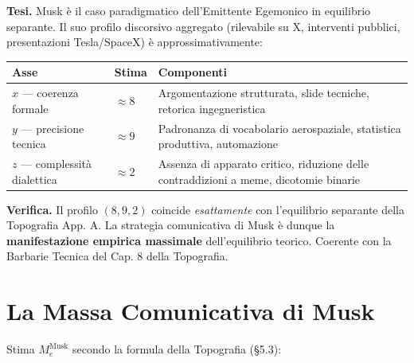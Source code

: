 \Hypoth{} \textbf{Tesi.} Musk è il caso paradigmatico dell'Emittente
Egemonico in equilibrio separante. Il suo profilo discorsivo aggregato
(rilevabile su X, interventi pubblici, presentazioni Tesla/SpaceX) è
approssimativamente:

{\def\LTcaptype{none} %
{\small\begin{longtable}[]{@{}
  >{\raggedright\arraybackslash}p{}
  >{\raggedright\arraybackslash}p{}
  >{\raggedright\arraybackslash}p{}@{}}
\toprule\noalign{}
\begin{minipage}[b]{\linewidth}\raggedright
Asse
\end{minipage} & \begin{minipage}[b]{\linewidth}\raggedright
Stima
\end{minipage} & \begin{minipage}[b]{\linewidth}\raggedright
Componenti
\end{minipage} \\
\midrule\noalign{}
\endhead
\bottomrule\noalign{}
\endlastfoot
\(x\) --- coerenza formale & \(\approx 8\) & Argomentazione strutturata,
slide tecniche, retorica ingegneristica \\
\(y\) --- precisione tecnica & \(\approx 9\) & Padronanza di vocabolario
aerospaziale, statistica produttiva, automazione \\
\(z\) --- complessità dialettica & \(\approx 2\) & Assenza di apparato
critico, riduzione delle contraddizioni a meme, dicotomie binarie \\
\end{longtable}}
}

\Proved{} \textbf{Verifica.} Il profilo \((8, 9, 2)\) coincide
\emph{esattamente} con l'equilibrio separante della Topografia App. A.
La strategia comunicativa di Musk è dunque la \textbf{manifestazione
empirica massimale} dell'equilibrio teorico. Coerente con la Barbarie
Tecnica del Cap. 8 della Topografia.



\section{La Massa Comunicativa di
Musk}\label{la-massa-comunicativa-di-musk}

Stima \(M_e^{\text{Musk}}\) secondo la formula della Topografia (\S{}5.3):

